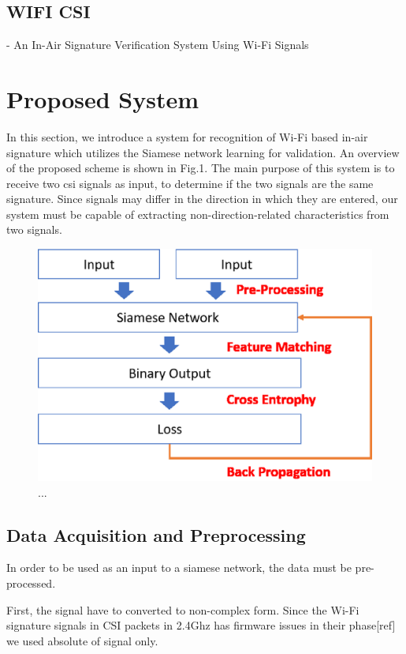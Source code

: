 \documentclass[runningheads]{llncs}
\begin{document}
\subsection{WIFI CSI}
- An In-Air Signature Verification System Using Wi-Fi Signals 

\section{Proposed System}

In this section, we introduce a system for recognition of Wi-Fi based in-air signature which utilizes the Siamese network learning for validation.
An overview of the proposed scheme is shown in Fig.1.
The main purpose of this system is to receive two csi signals as input, to determine if the two signals are the same signature.
Since signals may differ in the direction in which they are entered, our system must be capable of extracting non-direction-related characteristics from two signals.
\begin{figure}
\includegraphics[width=\textwidth]{methods1.eps}
\caption{...} \label{method1}
\end{figure}

\subsection{Data Acquisition and Preprocessing}
In order to be used as an input to a siamese network, the data must be pre-processed.

First, the signal have to converted to non-complex form.
Since the Wi-Fi signature signals in CSI packets in 2.4Ghz has firmware issues in their phase[ref] we used absolute of signal only.
\end{document}
